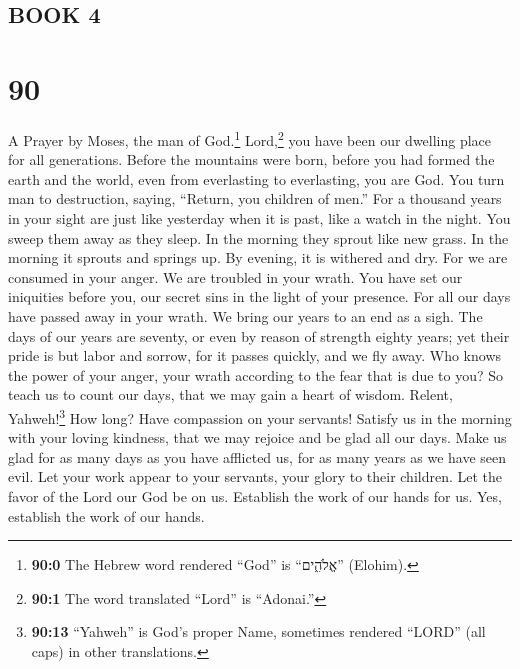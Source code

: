 \hypertarget{book-4}{%
\subsection{BOOK 4}\label{book-4}}

\hypertarget{section-82}{%
\section{90}\label{section-82}}

A Prayer by Moses, the man of God.\footnote{\textbf{90:0} The Hebrew
  word rendered ``God'' is ``אֱלֹהִ֑ים'' (Elohim).} 
Lord,\footnote{\textbf{90:1} The word translated ``Lord'' is ``Adonai.''}
you have been our dwelling place for all generations. 
Before the mountains were born, before you had formed the earth and the
world, even from everlasting to everlasting, you are God. 
You turn man to destruction, saying, ``Return, you children of men.''
 For a thousand years in your sight are just like
yesterday when it is past, like a watch in the night.  You
sweep them away as they sleep. In the morning they sprout like new
grass.  In the morning it sprouts and springs up. By
evening, it is withered and dry.  For we are consumed in
your anger. We are troubled in your wrath.  You have set
our iniquities before you, our secret sins in the light of your
presence.  For all our days have passed away in your
wrath. We bring our years to an end as a sigh.  The days
of our years are seventy, or even by reason of strength eighty years;
yet their pride is but labor and sorrow, for it passes quickly, and we
fly away.  Who knows the power of your anger, your wrath
according to the fear that is due to you?  So teach us to
count our days, that we may gain a heart of wisdom. 
Relent, Yahweh!\footnote{\textbf{90:13} ``Yahweh'' is God's proper Name,
  sometimes rendered ``LORD'' (all caps) in other translations.} How
long? Have compassion on your servants!  Satisfy us in
the morning with your loving kindness, that we may rejoice and be glad
all our days.  Make us glad for as many days as you have
afflicted us, for as many years as we have seen evil. 
Let your work appear to your servants, your glory to their children.
 Let the favor of the Lord our God be on us. Establish
the work of our hands for us. Yes, establish the work of our hands.

